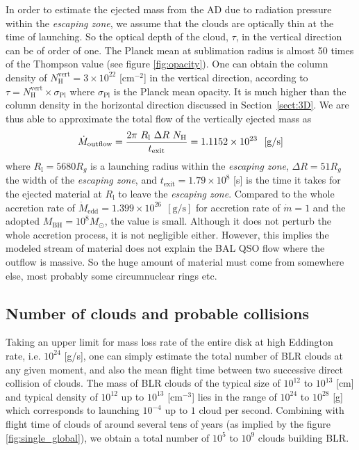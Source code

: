 \documentclass[twocolumn]{aastex62}
\begin{document}
In order to estimate the ejected mass from the AD due to radiation pressure within the \emph{escaping zone}, we assume that the clouds are optically thin at the time of launching. So the optical depth of the cloud, $\tau$, in the vertical direction can be of order of one. The Planck mean at sublimation radius is almost 50 times of the Thompson value (see figure \ref{fig:opacity}). One can obtain the column density of $N_{\mathrm{H}}^{\mathrm{vert}}= 3 \times 10^{22}$ [cm$^{-2}$] in the vertical direction, according to $\tau=N_{\mathrm{H}}^{\mathrm{vert}} \times \sigma_{\mathrm{Pl}}$ where $\sigma_{\mathrm{Pl}}$ is the Planck mean opacity. It is much higher than the column density in the horizontal direction discussed in Section~\ref{sect:3D}.  We are thus able to approximate the total flow of the vertically ejected mass as
\begin{equation}
\dot M_{\rm outflow} =
\frac{2 \pi\ R_{\mathrm{l}}\ \Delta R\ N_{\mathrm{H}}}{t_{\mathrm{exit}}} =
1.1152 \times 10^{23} ~~ \mathrm{[g/s]}
\end{equation}
where $R_{\mathrm{l}} = 5680 R_{g} $ is a launching radius within the \emph{escaping zone}, $\Delta R = 51 R_{g}$ the width of the \emph{escaping zone}, and $t_{\mathrm{exit}}= 1.79 \times 10^{8}$ [s] is the time it takes for the ejected material at $R_{\mathrm{l}}$ to leave the \emph{escaping zone}. Compared to the whole accretion rate of $\dot M_{\mathrm{edd}}= 1.399 \times 10^{26} ~~ \mathrm{[g/s]}$ for accretion rate of $\dot m = 1$ and the adopted $M_{\mathrm{BH}}=10^{8} M_{\odot}$, the value is small. Although it does not perturb the whole accretion process, it is not negligible either. However, this implies the modeled stream of material does not explain the BAL QSO flow \citep{Borguet2013} where the outflow is massive. So the huge amount of material must come from somewhere else, most probably some circumnuclear rings etc. 

\subsection{Number of clouds and probable collisions}\label{sec:collisions}

Taking an upper limit for mass loss rate of the entire disk at high Eddington rate, i.e. $10^{24}$  [g/s], one can simply estimate the total number of BLR clouds at any given moment, and also the mean flight time between two successive direct collision of clouds. The mass of BLR clouds of the typical size of $10^{12}$ to $10^{13}$ [cm] and typical density of $10^{12}$ up to $10^{13}$ [cm$^{-3}$] lies in the range of $10^{24}$ to $10^{28}$ [g] which corresponds to launching $10^{-4}$ up to $1$ cloud per second. Combining with flight time of clouds of around several tens of years (as implied by the figure \ref{fig:single_global}),
we obtain a total number of $10^{5}$ to $10^{9}$ clouds building BLR.
\end{document}

